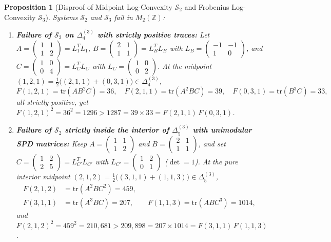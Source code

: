 \documentclass[11pt,a4paper]{article}
\newtheorem{proposition}[theorem]{Proposition}
\theoremstyle{definition}
\theoremstyle{remark}
\newcommand{\tr}{\mathrm{tr}}
\newcommand{\DeltaLat}{\Delta}
\begin{document}
\begin{proposition}[Disproof of Midpoint Log-Convexity $\mathcal{S}_2$ and Frobenius Log-Convexity $\mathcal{S}_3$]\label{prop:logconv}
Systems $\mathcal{S}_2$ and $\mathcal{S}_3$ fail in $M_2(\mathbb{Z})$:
\begin{enumerate}
\item \textbf{Failure of $\mathcal{S}_2$ on $\DeltaLat_4^{(3)}$ with strictly positive traces:} Let $A = \begin{pmatrix} 1 & 1 \\ 1 & 2 \end{pmatrix} = L_1^T L_1$, $B = \begin{pmatrix} 2 & 1 \\ 1 & 1 \end{pmatrix} = L_B^T L_B$ with $L_B = \begin{pmatrix} -1 & -1 \\ 1 & 0 \end{pmatrix}$, and $C = \begin{pmatrix} 1 & 0 \\ 0 & 4 \end{pmatrix} = L_C^T L_C$ with $L_C = \begin{pmatrix} 1 & 0 \\ 0 & 2 \end{pmatrix}$. At the midpoint $(1, 2, 1) = \frac{1}{2}\bigl((2, 1, 1) + (0, 3, 1)\bigr) \in \DeltaLat_4^{(3)}$,
\[
F(1, 2, 1) = \tr(A B^2 C) = 36, \quad
F(2, 1, 1) = \tr(A^2 B C) = 39, \quad
F(0, 3, 1) = \tr(B^3 C) = 33,
\]
all strictly positive, yet $F(1, 2, 1)^2 = 36^2 = 1296 > 1287 = 39 \times 33 = F(2, 1, 1)\,F(0, 3, 1)$.

\item \textbf{Failure of $\mathcal{S}_2$ strictly inside the interior of $\DeltaLat_5^{(3)}$ with unimodular SPD matrices:} Keep $A = \begin{pmatrix} 1 & 1 \\ 1 & 2 \end{pmatrix}$ and $B = \begin{pmatrix} 2 & 1 \\ 1 & 1 \end{pmatrix}$, and set $C = \begin{pmatrix} 1 & 2 \\ 2 & 5 \end{pmatrix} = L_{C'}^T L_{C'}$ with $L_{C'} = \begin{pmatrix} 1 & 2 \\ 0 & 1 \end{pmatrix}$ ($\det = 1$). At the pure interior midpoint $(2, 1, 2) = \frac{1}{2}\bigl((3, 1, 1) + (1, 1, 3)\bigr) \in \DeltaLat_5^{(3)}$,
\begin{align*}
F(2,1,2) &= \tr(A^2 B C^2) = 459, \\
F(3,1,1) &= \tr(A^3 B C) = 207, \qquad F(1,1,3) = \tr(A B C^3) = 1014,
\end{align*}
and $F(2, 1, 2)^2 = 459^2 = 210{,}681 > 209{,}898 = 207 \times 1014 = F(3, 1, 1)\,F(1, 1, 3)$.


\end{enumerate}
\end{proposition}
\end{document}
